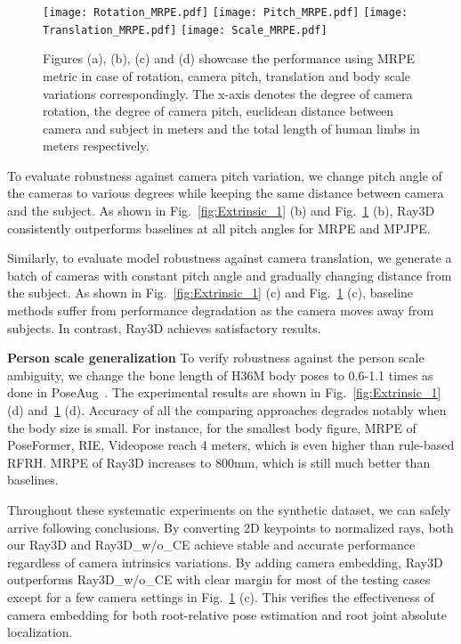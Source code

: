 \documentclass[10pt,twocolumn,letterpaper]{article}
\begin{document}
\begin{figure}
  \centering
  \texttt{[image: Rotation\_MRPE.pdf]}
  \texttt{[image: Pitch\_MRPE.pdf]}
  \texttt{[image: Translation\_MRPE.pdf]}
  \texttt{[image: Scale\_MRPE.pdf]}
  \vskip-9pt
  \caption{Figures (a), (b), (c) and (d) showcase the performance using MRPE metric in case of rotation, camera pitch, translation and body scale variations correspondingly. The x-axis denotes the degree of camera rotation, the degree of camera pitch, euclidean distance between camera and subject in meters and the total length of human limbs in meters respectively.}
  \label{fig:Extrinsic_2}
  \vspace{-4mm}
\end{figure}


To evaluate robustness against camera pitch variation, we change pitch angle of the cameras to various degrees while keeping the same distance between camera and the subject. As shown in Fig.~\ref{fig:Extrinsic_1} (b) and Fig.~\ref{fig:Extrinsic_2} (b), Ray3D consistently outperforms baselines at all pitch angles for MRPE and MPJPE. 

Similarly, to evaluate model robustness against camera translation, we generate a batch of cameras with constant pitch angle and gradually changing distance from the subject. As shown in Fig.~\ref{fig:Extrinsic_1} (c) and Fig.~\ref{fig:Extrinsic_2} (c), baseline methods suffer from performance degradation as the camera moves away from subjects. In contrast, Ray3D achieves satisfactory results.

\noindent\textbf{Person scale generalization}
To verify robustness against the person scale ambiguity, we change the bone length of H36M body poses to 0.6-1.1 times as done in PoseAug~\cite{GongZF21}. The experimental results are shown in Fig.~\ref{fig:Extrinsic_1} (d) and~\ref{fig:Extrinsic_2} (d). Accuracy of all the comparing approaches degrades notably when the body size is small. For instance, for the smallest body figure, MRPE of PoseFormer, RIE, Videopose reach 4 meters, which is even higher than rule-based RFRH. MRPE of Ray3D increases to 800mm, which is still much better than baselines.  


Throughout these systematic experiments on the synthetic dataset, we can safely arrive following conclusions. By converting 2D keypoints to normalized rays, both our Ray3D and Ray3D\_w/o\_CE achieve stable and accurate performance regardless of camera intrinsics variations. By adding camera embedding, Ray3D outperforms Ray3D\_w/o\_CE with clear margin for most of the testing cases except for a few camera settings in Fig.~\ref{fig:Extrinsic_2} (c). This verifies the effectiveness of camera embedding for both root-relative pose estimation and root joint absolute localization.  
\end{document}
